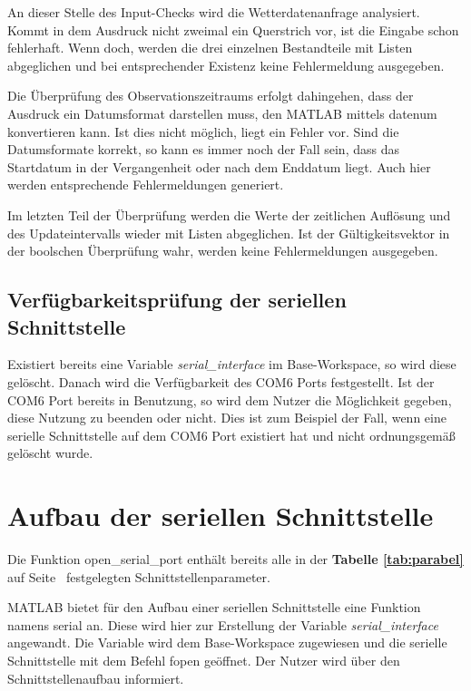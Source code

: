 
An dieser Stelle des Input-Checks wird die Wetterdatenanfrage analysiert. Kommt in dem Ausdruck nicht zweimal ein Querstrich vor, ist die Eingabe schon fehlerhaft. Wenn doch, werden die drei einzelnen Bestandteile mit Listen abgeglichen und bei entsprechender Existenz keine Fehlermeldung ausgegeben.  

Die Überprüfung des Observationszeitraums erfolgt dahingehen, dass der Ausdruck ein Datumsformat darstellen muss, den MATLAB mittels \textsf{datenum} konvertieren kann. Ist dies nicht möglich, liegt ein Fehler vor. Sind die Datumsformate korrekt, so kann es immer noch der Fall sein, dass das Startdatum in der Vergangenheit oder nach dem Enddatum liegt. Auch hier werden entsprechende Fehlermeldungen generiert.  

Im letzten Teil der Überprüfung werden die Werte der zeitlichen Auflösung und des Updateintervalls wieder mit Listen abgeglichen. Ist der Gültigkeitsvektor in der boolschen Überprüfung wahr, werden keine Fehlermeldungen ausgegeben. 

\subsection{Verfügbarkeitsprüfung der seriellen Schnittstelle}   
Existiert bereits eine Variable \textit{serial\_interface} im Base-Workspace, so wird diese gelöscht. Danach wird die Verfügbarkeit des COM6 Ports festgestellt. Ist der COM6 Port bereits in Benutzung, so wird dem Nutzer die Möglichkeit gegeben, diese Nutzung zu beenden oder nicht. Dies ist zum Beispiel der Fall, wenn eine serielle Schnittstelle auf dem COM6 Port existiert hat und nicht ordnungsgemäß gelöscht wurde. 
 
\section{Aufbau der seriellen Schnittstelle}
Die Funktion \textsf{open\_serial\_port} enthält bereits alle in der \textbf{Tabelle \ref{tab:parabel}} auf Seite~\pageref{coilabfrage} festgelegten Schnittstellenparameter.

MATLAB bietet für den Aufbau einer seriellen Schnittstelle eine Funktion namens \textsf{serial} an. Diese wird hier zur Erstellung der Variable \textit{serial\_interface} angewandt. Die Variable wird dem Base-Workspace zugewiesen und die serielle Schnittstelle mit dem Befehl \textsf{fopen} geöffnet. Der Nutzer wird über den Schnittstellenaufbau informiert.

